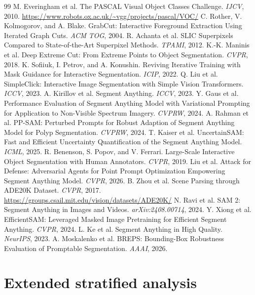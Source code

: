 \clearpage
\fontsize{8}{9}\selectfont
\begin{thebibliography}{99}
 M. Everingham et al. The PASCAL Visual Object Classes Challenge. \emph{IJCV}, 2010. \url{https://www.robots.ox.ac.uk/~vgg/projects/pascal/VOC/}
 C. Rother, V. Kolmogorov, and A. Blake. GrabCut: Interactive Foreground Extraction Using Iterated Graph Cuts. \emph{ACM TOG}, 2004.
 R. Achanta et al. SLIC Superpixels Compared to State-of-the-Art Superpixel Methods. \emph{TPAMI}, 2012.
 K.-K. Maninis et al. Deep Extreme Cut: From Extreme Points to Object Segmentation. \emph{CVPR}, 2018.
 K. Sofiiuk, I. Petrov, and A. Konushin. Reviving Iterative Training with Mask Guidance for Interactive Segmentation. \emph{ICIP}, 2022.
 Q. Liu et al. SimpleClick: Interactive Image Segmentation with Simple Vision Transformers. \emph{ICCV}, 2023.
 A. Kirillov et al. Segment Anything. \emph{ICCV}, 2023.
 Y. Gaus et al. Performance Evaluation of Segment Anything Model with Variational Prompting for Application to Non-Visible Spectrum Imagery. \emph{CVPRW}, 2024.
 A. Rahman et al. PP-SAM: Perturbed Prompts for Robust Adaption of Segment Anything Model for Polyp Segmentation. \emph{CVPRW}, 2024.
 T. Kaiser et al. UncertainSAM: Fast and Efficient Uncertainty Quantification of the Segment Anything Model. \emph{ICML}, 2025.
 R. Benenson, S. Popov, and V. Ferrari. Large-Scale Interactive Object Segmentation with Human Annotators. \emph{CVPR}, 2019.
 Liu et al. Attack for Defense: Adversarial Agents for Point Prompt Optimization Empowering Segment Anything Model. \emph{CVPR}, 2026.
 B. Zhou et al. Scene Parsing through ADE20K Dataset. \emph{CVPR}, 2017. \url{https://groups.csail.mit.edu/vision/datasets/ADE20K/}
 N. Ravi et al. SAM 2: Segment Anything in Images and Videos. \emph{arXiv:2408.00714}, 2024.
 Y. Xiong et al. EfficientSAM: Leveraged Masked Image Pretraining for Efficient Segment Anything. \emph{CVPR}, 2024.
 L. Ke et al. Segment Anything in High Quality. \emph{NeurIPS}, 2023.
 A. Moskalenko et al. BREPS: Bounding-Box Robustness Evaluation of Promptable Segmentation. \emph{AAAI}, 2026.
\end{thebibliography}

\clearpage
\normalsize
\appendix

\section{Extended stratified analysis}
\label{app:extended}

